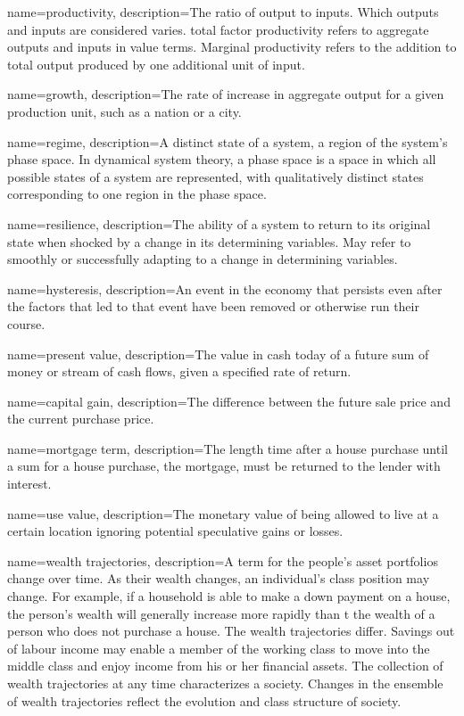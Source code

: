 {
name=productivity,
description={The ratio of \gls{output} to \glspl{input}. Which outputs and inputs are considered varies. \gls{total factor productivity} refers to aggregate outputs and inputs in value terms. Marginal productivity refers to the addition to total output produced by one additional unit of input.} 
}

{
name=growth,
description={The rate of increase in aggregate \gls{output} for a given production unit, such as a nation  or a city.}
}

{
name=regime,
description={A distinct state of a system, a region of the system's phase space. In dynamical system theory, a phase space is a space in which all possible states of a system are represented, with qualitatively distinct  states corresponding to one region in the phase space.}
}

{
name=resilience,
description={The ability of a system to return to its original state when shocked by a change in its determining variables. May refer to smoothly or successfully adapting to a change in  determining variables.}
}

{
name=hysteresis,
description={An event in the economy that persists even after the factors that led to that event have been removed or otherwise run their course.}
}

{
name=present value,
description={The value in cash today of a future sum of money or stream of cash flows, given a specified rate of return.}
}

{
name=capital gain,
description={The difference between the future sale price and the current purchase price.}
}

{
name=mortgage term,
description={The length time after a house purchase until a sum for a house purchase, the mortgage, must be returned to the lender with interest.}
}

{
name=use value,
description={The monetary value of being allowed to live at a certain location ignoring potential speculative gains or losses.}
}

{
name=wealth trajectories,
description={A term for the people's  asset portfolios change over time. As their \gls{wealth} changes, an individual's \gls{class} position may change. For example, if a household is able to make  a down payment on a house,  the person's wealth will generally increase more rapidly than t the wealth of a person who does not purchase a house. The wealth trajectories differ. Savings out of labour income may enable a member of the \gls{working class} to move into the \gls{middle class} and enjoy income from his or her financial assets. The collection  of wealth trajectories at any time characterizes a society. Changes in the ensemble of wealth trajectories reflect the evolution and class structure of society.   } 
}


